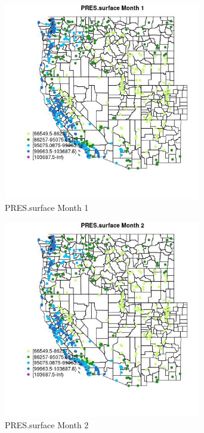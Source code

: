 \begin{figure} 
\centering  
\includegraphics[width=0.77\textwidth]{Code_Outputs/Report_ML_input_PM25_Step4_part_e_de_duplicated_aves_compiled_2019-05-14wNAs_MapObsMo1PRESsurface.jpg} 
\caption{\label{fig:Report_ML_input_PM25_Step4_part_e_de_duplicated_aves_compiled_2019-05-14wNAsMapObsMo1PRESsurface}PRES.surface Month 1} 
\end{figure} 
 

\begin{figure} 
\centering  
\includegraphics[width=0.77\textwidth]{Code_Outputs/Report_ML_input_PM25_Step4_part_e_de_duplicated_aves_compiled_2019-05-14wNAs_MapObsMo2PRESsurface.jpg} 
\caption{\label{fig:Report_ML_input_PM25_Step4_part_e_de_duplicated_aves_compiled_2019-05-14wNAsMapObsMo2PRESsurface}PRES.surface Month 2} 
\end{figure} 
 

